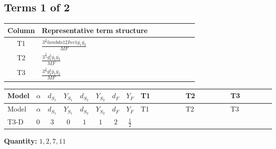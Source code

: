 \documentclass[8pt]{article}
\begin{document}
\begin{landscape}
\subsection*{Terms 1 of 2}
\begin{center}
\begin{tabular}{@{}c >{\raggedright\arraybackslash}p{0.82\linewidth}@{}}
\toprule
Column & Representative term structure \\
\midrule
T1 & \(\displaystyle \frac{3^{\frac{3}{4}} lambda12Inv1 \overline{y_{1}} \overline{y_{2}}}{MF}\) \\
\midrule
T2 & \(\displaystyle \frac{3^{\frac{3}{4}} g_{1}^{2} \overline{y_{1}} \overline{y_{2}}}{MF}\) \\
\midrule
T3 & \(\displaystyle \frac{3^{\frac{3}{4}} g_{2}^{2} \overline{y_{1}} \overline{y_{2}}}{MF}\) \\
\midrule
\bottomrule
\end{tabular}
\end{center}
\smallskip
\tiny
\begin{longtable}{@{}llcccccc >{\raggedright\arraybackslash}p{0.21\linewidth} >{\raggedright\arraybackslash}p{0.21\linewidth} >{\raggedright\arraybackslash}p{0.21\linewidth}@{}}
\toprule
Model & $\alpha$ & $d_{S_1}$ & $Y_{S_1}$ & $d_{S_2}$ & $Y_{S_2}$ & $d_F$ & $Y_F$ & T1 & T2 & T3 \\
\midrule
\endfirsthead
\toprule
Model & $\alpha$ & $d_{S_1}$ & $Y_{S_1}$ & $d_{S_2}$ & $Y_{S_2}$ & $d_F$ & $Y_F$ & T1 & T2 & T3 \\
\midrule
\endhead
T3-D & $0$ & $3$ & $0$ & $1$ & $1$ & $2$ & $\frac{1}{2}$ & \scriptsize\adjustbox{max width=\linewidth}{$\begin{gathered} \frac{3^{\frac{3}{4}} lambda12Inv1 \overline{y_{1}} \overline{y_{2}}}{6 MF}\end{gathered}$} & \scriptsize\adjustbox{max width=\linewidth}{$\begin{gathered} \frac{3^{\frac{3}{4}} g_{1}^{2} \overline{y_{1}} \overline{y_{2}}}{8 MF}\end{gathered}$} & \scriptsize\adjustbox{max width=\linewidth}{$\begin{gathered} \frac{25 \cdot 3^{\frac{3}{4}} g_{2}^{2} \overline{y_{1}} \overline{y_{2}}}{24 MF}\end{gathered}$} \\
\midrule
\bottomrule
\end{longtable}
\clearpage
\noindent\textbf{Quantity: }$\mathrm{1,2,7,11}$\par\smallskip

\end{landscape}
\end{document}
